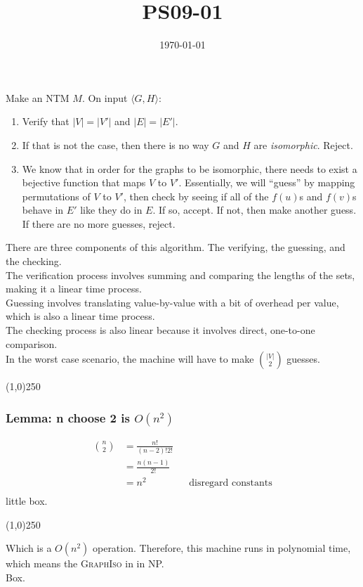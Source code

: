 \documentclass{article}
\title{PS09-01}
\date{\today}
\begin{document}
\maketitle
Make an NTM $M$. On input $\langle G, H \rangle$:\\
\begin{enumerate}
	\item Verify that $\lvert V \rvert = \lvert V' \rvert$ and $\lvert E\rvert = \lvert E' \rvert$.
	\item If that is not the case, then there is no way $G$ and $H$ are \textit{isomorphic}. Reject.
	\item We know that in order for the graphs to be isomorphic, there needs to exist a bejective function
	that maps $V$ to $V'$. Essentially, we will ``guess'' by mapping permutations of $V$ to $V'$, then check
	by seeing if all of the $f(u)$s and $f(v)$s behave in $E'$ like they do in $E$. If so, accept. If not, then
	make another guess. If there are no more guesses, reject.
\end{enumerate}
There are three components of this algorithm. The verifying, the guessing, and the checking.\\
The verification process involves summing and comparing the lengths of the sets, making it a linear time process.\\
Guessing involves translating value-by-value with a bit of overhead per value, which is also a linear time process.\\
The checking process is also linear because it involves direct, one-to-one comparison.\\ 
In the worst case scenario, the machine will have to make ${\lvert V \rvert \choose 2}$ guesses. 
\begin{center}
\line(1,0){250}
\end{center}
\subsubsection*{Lemma: n choose 2 is $O(n^2)$}

\begin{align*}
{n \choose 2} &= \frac{n!}{(n-2)!2!}&&\\
&= \frac{n(n-1)}{2!}&&\\
&= n^2 && \text{disregard constants}\\
\end{align*}
little box.
\begin{center}
\line(1,0){250}
\end{center}

Which is a $O(n^2)$ operation. Therefore, this machine runs in polynomial time, which means the \textsc{GraphIso} in in NP.\\
Box.
\end{document}
